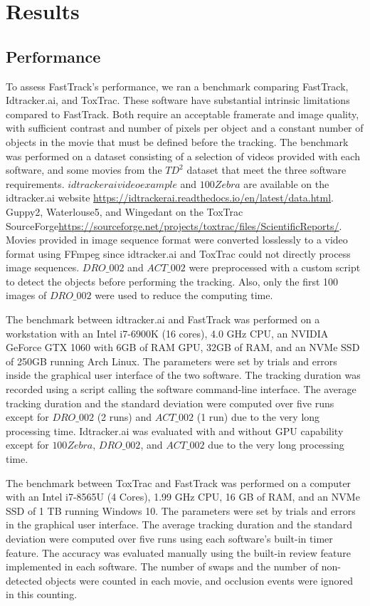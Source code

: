 \chapter{Results}

    \section{Performance}
    To assess FastTrack's performance, we ran a benchmark comparing FastTrack, Idtracker.ai, and ToxTrac. These software have substantial intrinsic limitations compared to FastTrack. Both require an acceptable framerate and image quality, with sufficient contrast and number of pixels per object and a constant number of objects in the movie that must be defined before the tracking. The benchmark was performed on a dataset consisting of a selection of videos provided with each software, and some movies from the $TD^2$ dataset that meet the three software requirements. $idtrackeraivideoexample$ and $100Zebra$ are available on the idtracker.ai website \url{https://idtrackerai.readthedocs.io/en/latest/data.html}. Guppy2, Waterlouse5, and Wingedant on the ToxTrac SourceForge\url{https://sourceforge.net/projects/toxtrac/files/ScientificReports/}. Movies provided in image sequence format were converted losslessly to a video format using FFmpeg since idtracker.ai and ToxTrac could not directly process image sequences. $DRO\_002$ and $ACT\_002$ were preprocessed with a custom script to detect the objects before performing the tracking. Also, only the first 100 images of $DRO\_002$ were used to reduce the computing time.

    The benchmark between idtracker.ai and FastTrack was performed on a workstation with an Intel i7-6900K (16 cores), 4.0 GHz CPU, an NVIDIA GeForce GTX 1060 with 6GB of RAM GPU, 32GB of RAM, and an NVMe SSD of 250GB running Arch Linux. The parameters were set by trials and errors inside the graphical user interface of the two software. The tracking duration was recorded using a script calling the software command-line interface. The average tracking duration and the standard deviation were computed over five runs except for $DRO\_002$  (2 runs) and $ACT\_002$ (1 run) due to the very long processing time. Idtracker.ai was evaluated with and without GPU capability except for $100Zebra$, $DRO\_002$, and $ACT\_002$ due to the very long processing time.

    The benchmark between ToxTrac and FastTrack was performed on a computer with an Intel i7-8565U (4 Cores), 1.99 GHz CPU, 16 GB of RAM, and an NVMe SSD of 1 TB running Windows 10. The parameters were set by trials and errors in the graphical user interface. The average tracking duration and the standard deviation were computed over five runs using each software's built-in timer feature. The accuracy was evaluated manually using the built-in review feature implemented in each software. The number of swaps and the number of non-detected objects were counted in each movie, and occlusion events were ignored in this counting.

